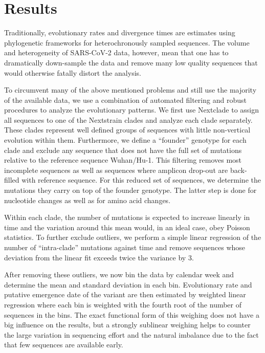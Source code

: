 \documentclass[aps,rmp, twocolumn]{revtex4}
\begin{document}
\section*{Results}

Traditionally, evolutionary rates and divergence times are estimates using phylogenetic frameworks for heterochronously sampled sequences.
The volume and heterogeneity of SARS-CoV-2 data, however, mean that one has to dramatically down-sample the data and remove many low quality sequences that would otherwise fatally distort the analysis.

To circumvent many of the above mentioned problems and still use the majority of the available data, we use a combination of automated filtering and robust procedures to analyze the evolutionary patterns.
We first use Nextclade \citep{aksamentov_nextclade_2021} to assign all sequences to one of the Nextstrain \citep{hadfield_nextstrain_2018} clades and analyze each clade separately.
These clades represent well defined groups of sequences with little non-vertical evolution within them.
Furthermore, we define a ``founder'' genotype for each clade and exclude any sequence that does not have the full set of mutations relative to the reference sequence Wuhan/Hu-1.
This filtering removes most incomplete sequences as well as sequences where amplicon drop-out are back-filled with reference sequence.
For this reduced set of sequences, we determine the mutations they carry on top of the founder genotype.
The latter step is done for nucleotide changes as well as for amino acid changes.

Within each clade, the number of mutations is expected to increase linearly in time and the variation around this mean would, in an ideal case, obey Poisson statistics.
To further exclude outliers, we perform a simple linear regression of the number of ``intra-clade'' mutations against time and remove sequences whose deviation from the linear fit exceeds twice the variance by 3.

After removing these outliers, we now bin the data by calendar week and determine the mean and standard deviation in each bin.
Evolutionary rate and putative emergence date of the variant are then estimated by weighted linear regression where each bin is weighted with the fourth root of the number of sequences in the bins.
The exact functional form of this weighing does not have a big influence on the results, but a strongly sublinear weighing helps to counter the large variation in sequencing effort and the natural imbalance due to the fact that few sequences are available early.
\end{document}

